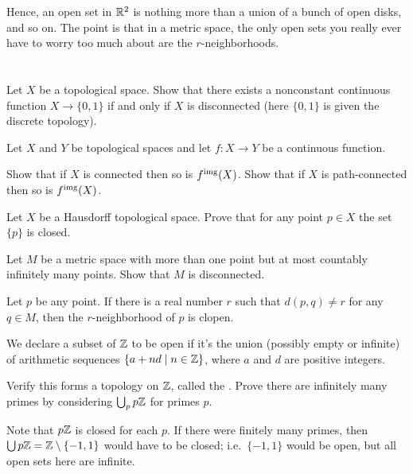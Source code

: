 Hence, an open set in $\mathbb R^2$ is nothing more than a union
of a bunch of open disks, and so on.
The point is that in a metric space, the only open sets you really
ever have to worry too much about are the $r$-neighborhoods.


\section{\problemhead}

\begin{dproblem}
	Let $X$ be a topological space.
	Show that there exists a nonconstant continuous function $X \to \{0,1\}$ if and
	only if $X$ is disconnected (here $\{0,1\}$ is given the discrete topology).
	\label{prob:disconnected_better_def}
\end{dproblem}

\begin{sproblem}
	Let $X$ and $Y$ be topological spaces
	and let $f \colon X \to Y$ be a continuous function.
	\begin{enumerate}[(a)]
		\ii Show that if $X$ is connected then so is $f^{\text{img}}(X)$.
		\ii Show that if $X$ is path-connected then so is $f^{\text{img}}(X)$.
	\end{enumerate}
\end{sproblem}

\begin{problem}
	Let $X$ be a Hausdorff topological space.
	Prove that for any point $p \in X$
	the set $\{p\}$ is closed.
\end{problem}

\begin{problem}
	Let $M$ be a metric space with more than one point
	but at most countably infinitely many points.
	Show that $M$ is disconnected.
	\begin{hint}
		Let $p$ be any point.
		If there is a real number $r$
		such that $d(p,q) \neq r$ for any $q \in M$,
		then the $r$-neighborhood of $p$ is clopen.
	\end{hint}
\end{problem}

\begin{problem}[Furstenberg]
	We declare a subset of $\mathbb Z$ to be open
	if it's the union (possibly empty or infinite)
	of arithmetic sequences $\left\{ a + nd \mid n \in \mathbb Z \right\}$,
	where $a$ and $d$ are positive integers.
	\begin{enumerate}[(a)]
		\ii Verify this forms a topology on $\mathbb Z$,
		called the .
		\ii Prove there are infinitely many primes by considering $\bigcup_p p\mathbb Z$
		for primes $p$.
	\end{enumerate}
	\begin{hint}
		Note that $p\mathbb Z$ is closed for each $p$.
		If there were finitely many primes, then
		$\bigcup p\mathbb Z = \mathbb Z \setminus \{-1,1\}$ would have to be closed;
		i.e.\ $\{-1,1\}$ would be open, but all open sets here are infinite.
	\end{hint}
\end{problem}

